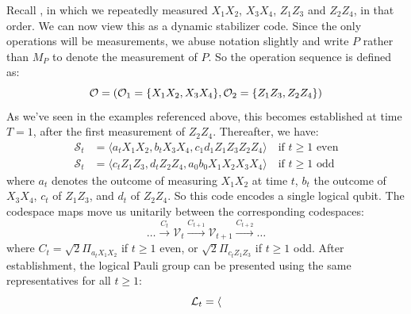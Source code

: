 \begin{example}
    Recall , in which we repeatedly measured $X_1 X_2$, $X_3 X_4$, $Z_1 Z_3$ and $Z_2 Z_4$, in that order.
    We can now view this as a dynamic stabilizer code.
    Since the only operations will be measurements, we abuse notation slightly and write $P$ rather than $M_P$ to denote the measurement of $P$.
    So the operation sequence is defined as:
    \begin{equation}
        \mathcal{O} = (\mathcal{O}_1 = \{X_1 X_2, X_3 X_4\}, \mathcal{O}_2 = \{Z_1 Z_3, Z_2 Z_4\})
    \end{equation}
    As we've seen in the examples referenced above, this becomes established at time $T=1$, after the first measurement of $Z_2 Z_4$.
    Thereafter, we have:
    \begin{equation}
        \begin{aligned}
            \mathcal{S}_t &= \langle a_t X_1 X_2, b_t X_3 X_4, c_1 d_1 Z_1 Z_3 Z_2 Z_4 \rangle \quad \text{if $t \geq 1$ even} \\
            \mathcal{S}_t &= \langle c_t Z_1 Z_3, d_t Z_2 Z_4, a_0 b_0 X_1 X_2 X_3 X_4 \rangle \quad \text{if $t \geq 1$ odd}
        \end{aligned}
    \end{equation}
    where $a_t$ denotes the outcome of measuring $X_1 X_2$ at time $t$, $b_t$ the outcome of $X_3 X_4$, $c_t$ of $Z_1 Z_3$, and $d_t$ of $Z_2 Z_4$.
    So this code encodes a single logical qubit.
    The codespace maps move us unitarily between the corresponding codespaces:
    \begin{equation}
        \ldots \xrightarrow{C_t} \mathcal{V}_{t} \xrightarrow{C_{t+1}} \mathcal{V}_{t+1} \xrightarrow{C_{t+2}} \ldots
    \end{equation}
    where $C_t = \sqrt{2}\Pi_{a_t X_1 X_2}$ if $t \geq 1$ even, or $\sqrt{2}\Pi_{c_t Z_1 Z_3}$ if $t \geq 1$ odd.
    After establishment, the logical Pauli group can be presented using the same representatives for all $t \geq 1$:
    \begin{equation}
        \LLL_t = \langle

\end{equation}
\end{example}
